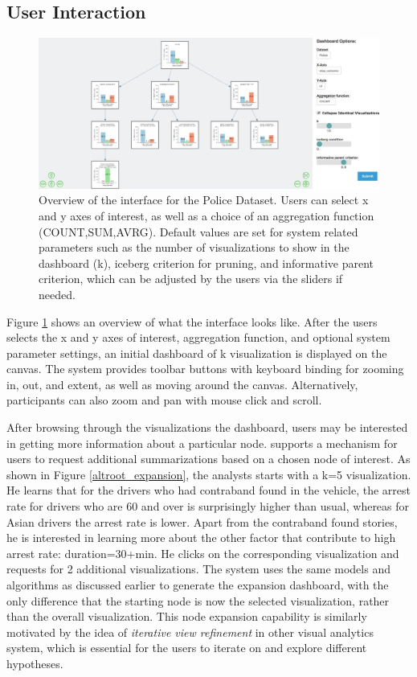 \subsection{User Interaction}
\begin{figure}[ht!]
\label{overview}
\centering
\includegraphics[width=\linewidth]{figures/overview.jpeg}
\caption{Overview of the \system interface for the Police Dataset. Users can select x and y axes of interest, as well as a choice of an aggregation function (COUNT,SUM,AVRG). Default values are set for system related parameters such as the number of visualizations to show in the dashboard (k), iceberg criterion for pruning, and informative parent criterion, which can be adjusted by the users via the sliders if needed.}
\end{figure}
\par Figure \ref{overview} shows an overview of what the \system interface looks like. After the users selects the x and y axes of interest, aggregation function, and optional system parameter settings, an initial dashboard of k visualization is displayed on the canvas. The system provides toolbar buttons with keyboard binding for zooming in, out, and extent, as well as moving around the canvas. Alternatively, participants can also zoom and pan with mouse click and scroll.
\par After browsing through the visualizations the dashboard, users may be interested in getting more information about a particular node. \system supports a mechanism for users to request additional summarizations based on a chosen node of interest. As shown in Figure \ref{altroot_expansion}, the analysts starts with a k=5 visualization. He learns that for the drivers who had contraband found in the vehicle, the arrest rate for drivers who are 60 and over is surprisingly higher than usual, whereas for Asian drivers the arrest rate is lower. Apart from the contraband found stories, he is interested in learning more about the other factor that contribute to high arrest rate: duration=30+min. He clicks on the corresponding visualization and requests for 2 additional visualizations. The system uses the same models and algorithms as discussed earlier to generate the expansion dashboard, with the only difference that the starting node is now the selected visualization, rather than the overall visualization. This node expansion capability is similarly motivated by the idea of \textit{iterative view refinement} in other visual analytics system\cite{Wongsuphasawat2016,Hoque2017}, which is essential for the users to iterate on and explore different hypotheses. 
